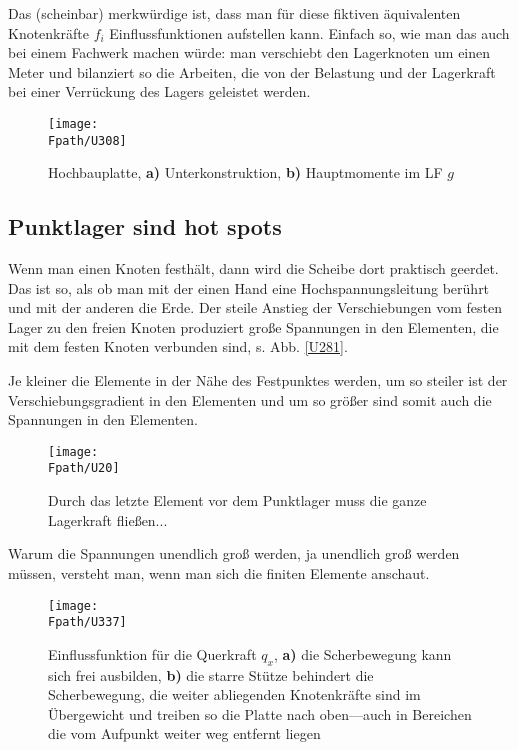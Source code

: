 {{{{{{Das (scheinbar) merkw\"{u}rdige ist, dass man f\"{u}r diese \glq fiktiven\grq{} \"{a}quivalenten Knotenkr\"{a}fte $f_i$ Einflussfunktionen aufstellen kann. Einfach so, wie man das auch bei einem Fachwerk machen w\"{u}rde: man verschiebt den Lagerknoten um einen Meter und bilanziert so die Arbeiten, die von der Belastung und der Lagerkraft bei einer Verr\"{u}ckung des Lagers geleistet werden.

\begin{figure}[tbp]
\centering
\texttt{[image: \\Fpath/U308]}
\caption{Hochbauplatte, \textbf{ a)} Unterkonstruktion, \textbf{ b)} Hauptmomente im LF $g$} \label{U308}
\end{figure}%

{\textcolor{sectionTitleBlue}{\section{Punktlager sind hot spots}}}\label{Punktlager}
Wenn man einen Knoten festh\"{a}lt, dann wird die Scheibe dort praktisch \glq geerdet\grq{}. Das ist so, als ob man mit der einen Hand eine Hochspannungsleitung ber\"{u}hrt und mit der anderen die Erde. Der steile Anstieg der Verschiebungen vom festen Lager zu den freien Knoten produziert gro{\ss}e Spannungen in den Elementen, die mit dem festen Knoten verbunden sind, s. Abb. \ref{U281}.

Je kleiner die Elemente in der N\"{a}he des Festpunktes werden, um so steiler ist der Verschiebungsgradient in den Elementen und um so gr\"{o}{\ss}er sind somit auch die Spannungen in den Elementen.
\begin{figure}
\centering
\if {} \sidecaption[t] \fi
{\texttt{[image: \\Fpath/U20]}}
\caption{Durch das letzte Element vor dem Punktlager muss die ganze Lagerkraft flie{\ss}en...}
\label{U20}%
\end{figure}%

Warum die Spannungen unendlich gro{\ss} werden, ja unendlich gro{\ss} werden m\"{u}ssen, versteht man, wenn man sich die finiten Elemente anschaut.
\begin{figure}
\centering
\if {} \sidecaption[t] \fi
{\texttt{[image: \\Fpath/U337]}}
\caption{Einflussfunktion f\"{u}r die Querkraft $q_x$, \textbf{ a)} die Scherbewegung kann sich frei ausbilden, \textbf{ b)} die starre St\"{u}tze behindert die Scherbewegung, die weiter abliegenden Knotenkr\"{a}fte sind im \"{U}bergewicht und treiben so die Platte nach oben---auch in Bereichen die vom Aufpunkt weiter weg entfernt liegen}
\label{U337}%
\end{figure}%

}}}}}}
